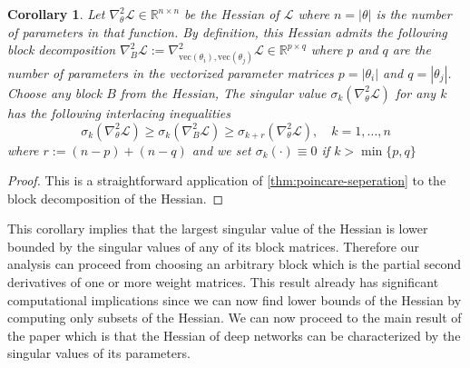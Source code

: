 \documentclass{article}
\theoremstyle{plain}
\newtheorem{corollary}[theorem]{Corollary}
\theoremstyle{definition}
\theoremstyle{remark}
\begin{document}
\begin{corollary}
\label{corr:block-interlacing-for-hessian}
Let $\nabla^2_{\theta}\mathcal{L} \in \mathbb{R}^{n \times n}$ be the Hessian of $\mathcal{L}$ where $n = |\theta|$ is the number of parameters in that function. By definition, this Hessian admits the following block decomposition $\nabla^2_{B} \mathcal{L} := \nabla^2_{\mathrm{vec}({\theta_i}), \mathrm{vec}({\theta_j})} \mathcal{L} \in \mathbb{R}^{p \times q}$ where $p$ and $q$ are the number of parameters in the vectorized parameter matrices $p = |\theta_i|$ and $q = |\theta_j|$. Choose any block $B$ from the Hessian, The singular value $\sigma_k(\nabla^2_{\theta}\mathcal{L})$ for any $k$ has the following interlacing inequalities 
\begin{equation*}
\label{eq:block-interlacing}
\sigma_k(\nabla^2_{\theta}\mathcal{L}) \geq \sigma_k(\nabla^2_{B} \mathcal{L}) \geq \sigma_{k + r}(\nabla^2_{\theta} \mathcal{L}), \quad k = 1, \ldots, n
\end{equation*}
where $r := (n - p) + (n - q)$ and we set $\sigma_k(\cdot) \equiv 0$ if $k > \min\{p, q\}$
\end{corollary}
\begin{proof}
This is a straightforward application of \cref{thm:poincare-seperation} to the block decomposition of the Hessian.
\end{proof}

This corollary implies that the largest singular value of the Hessian is lower bounded by the singular values of any of its block matrices. Therefore our analysis can proceed from choosing an arbitrary block which is the partial second derivatives of one or more weight matrices. This result already has significant computational implications since we can now find lower bounds of the Hessian by computing only subsets of the Hessian. We can now proceed to the main result of the paper which is that the Hessian of deep networks can be characterized by the singular values of its parameters.
\end{document}
